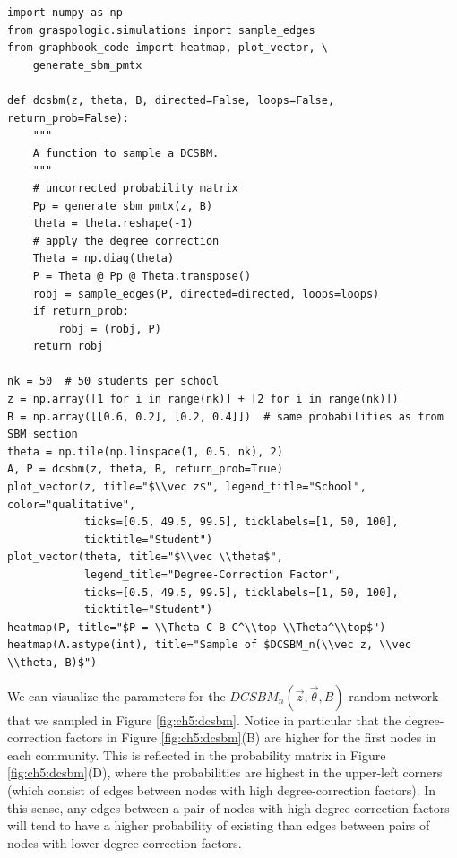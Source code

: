 \begin{lstlisting}[style=python]
import numpy as np
from graspologic.simulations import sample_edges
from graphbook_code import heatmap, plot_vector, \
    generate_sbm_pmtx

def dcsbm(z, theta, B, directed=False, loops=False, return_prob=False):
    """
    A function to sample a DCSBM.
    """
    # uncorrected probability matrix
    Pp = generate_sbm_pmtx(z, B)
    theta = theta.reshape(-1)
    # apply the degree correction
    Theta = np.diag(theta)
    P = Theta @ Pp @ Theta.transpose()
    robj = sample_edges(P, directed=directed, loops=loops)
    if return_prob:
        robj = (robj, P)
    return robj

nk = 50  # 50 students per school
z = np.array([1 for i in range(nk)] + [2 for i in range(nk)])
B = np.array([[0.6, 0.2], [0.2, 0.4]])  # same probabilities as from SBM section
theta = np.tile(np.linspace(1, 0.5, nk), 2)
A, P = dcsbm(z, theta, B, return_prob=True)
plot_vector(z, title="$\\vec z$", legend_title="School", color="qualitative", 
            ticks=[0.5, 49.5, 99.5], ticklabels=[1, 50, 100],
            ticktitle="Student")
plot_vector(theta, title="$\\vec \\theta$", 
            legend_title="Degree-Correction Factor", 
            ticks=[0.5, 49.5, 99.5], ticklabels=[1, 50, 100],
            ticktitle="Student")
heatmap(P, title="$P = \\Theta C B C^\\top \\Theta^\\top$")
heatmap(A.astype(int), title="Sample of $DCSBM_n(\\vec z, \\vec \\theta, B)$")
\end{lstlisting}
We can visualize the parameters for the $DCSBM_n(\vec z, \vec \theta, B)$ random network that we sampled in Figure \ref{fig:ch5:dcsbm}. Notice in particular that the degree-correction factors in Figure \ref{fig:ch5:dcsbm}(B) are higher for the first nodes in each community. This is reflected in the probability matrix in Figure \ref{fig:ch5:dcsbm}(D), where the probabilities are highest in the upper-left corners (which consist of edges between nodes with high degree-correction factors). In this sense, any edges between a pair of nodes with high degree-correction factors will tend to have a higher probability of existing than edges between pairs of nodes with lower degree-correction factors.

